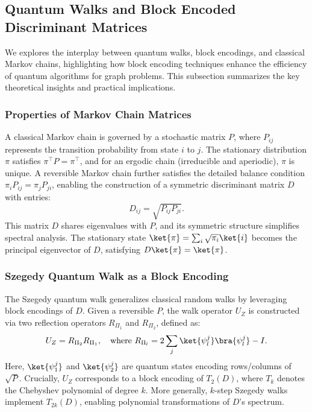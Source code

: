 \documentclass{article}
\begin{document}
    \subsection{Quantum Walks and Block Encoded Discriminant Matrices}

    We explores the interplay between quantum walks, block encodings, and classical Markov chains, highlighting how block encoding techniques enhance the efficiency of quantum algorithms for graph problems. This subsection summarizes the key theoretical insights and practical implications.

    \subsubsection{Properties of Markov Chain Matrices}
    A classical Markov chain is governed by a stochastic matrix $ P $, where $ P_{ij} $ represents the transition probability from state $ i $ to $ j $. The stationary distribution $ \pi $ satisfies $ \pi^\top P = \pi^\top $, and for an ergodic chain (irreducible and aperiodic), $ \pi $ is unique. A reversible Markov chain further satisfies the detailed balance condition $ \pi_i P_{ij} = \pi_j P_{ji} $, enabling the construction of a symmetric discriminant matrix $ D $ with entries:
    \begin{equation}
        D_{ij} = \sqrt{P_{ij} P_{ji}}. \label{eq:discriminant_matrix}
    \end{equation}
    This matrix $ D $ shares eigenvalues with $ P $, and its symmetric structure simplifies spectral analysis. The stationary state $ \ket{\pi} = \sum_i \sqrt{\pi_i} \ket{i} $ becomes the principal eigenvector of $ D $, satisfying $ D \ket{\pi} = \ket{\pi} $.

    \subsubsection{Szegedy Quantum Walk as a Block Encoding}
    The Szegedy quantum walk generalizes classical random walks by leveraging block encodings of $ D $. Given a reversible $ P $, the walk operator $ U_Z $ is constructed via two reflection operators $ R_{\Pi_1} $ and $ R_{\Pi_2} $, defined as:
    \begin{equation}
        U_Z = R_{\Pi_2} R_{\Pi_1}, \quad \text{where } R_{\Pi_l} = 2 \sum_j \ket{\psi_l^j}\bra{\psi_l^j} - I.
    \end{equation}
    Here, $ \ket{\psi_1^j} $ and $ \ket{\psi_2^j} $ are quantum states encoding rows/columns of $ \sqrt{P} $. Crucially, $ U_Z $ corresponds to a block encoding of $ T_2(D) $, where $ T_k $ denotes the Chebyshev polynomial of degree $ k $. More generally, $ k $-step Szegedy walks implement $ T_{2k}(D) $, enabling polynomial transformations of $ D $'s spectrum.
\end{document}
